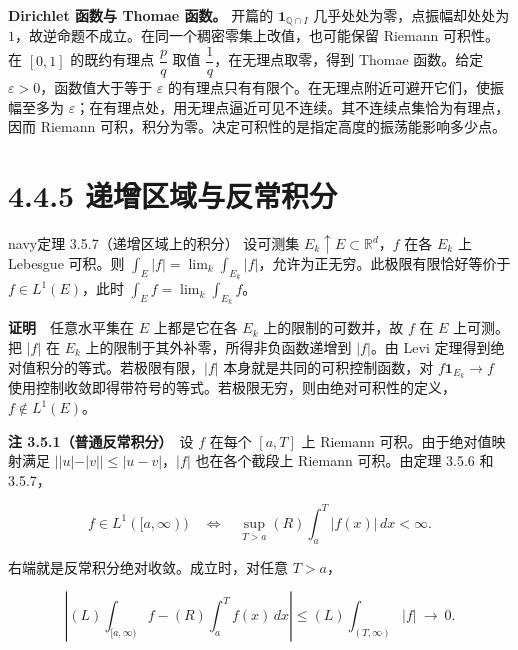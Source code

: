 \documentclass[11pt,a4paper]{article}
\begin{document}
\textbf{Dirichlet 函数与 Thomae 函数。} 开篇的
\(\mathbf1_{\mathbb Q\cap I}\) 几乎处处为零，点振幅却处处为
\(1\)，故逆命题不成立。在同一个稠密零集上改值，也可能保留 Riemann
可积性。在 \([0,1]\) 的既约有理点 \(\dfrac pq\) 取值
\(\dfrac1q\)，在无理点取零，得到 Thomae 函数。给定
\(\varepsilon>0\)，函数值大于等于 \(\varepsilon\)
的有理点只有有限个。在无理点附近可避开它们，使振幅至多为
\(\varepsilon\)；在有理点处，用无理点逼近可见不连续。其不连续点集恰为有理点，因而
Riemann 可积，积分为零。决定可积性的是指定高度的振荡能影响多少点。

\section[\S{}4.4.5
递增区域与反常积分]{4.4.5
递增区域与反常积分}\label{ux9012ux589eux533aux57dfux4e0eux53cdux5e38ux79efux5206}

\begin{sboxenv}{navy}{定理 3.5.7（递增区域上的积分）}
设可测集 \(E_k\uparrow E\subset\mathbb R^d\)，\(f\) 在各 \(E_k\) 上
Lebesgue 可积。则
\(\int_E|f|=\lim_k\int_{E_k}|f|\)，允许为正无穷。此极限有限恰好等价于
\(f\in L^1(E)\)，此时 \(\int_E f=\lim_k\int_{E_k}f\)。

\end{sboxenv}

\textbf{证明}　任意水平集在 \(E\) 上都是它在各 \(E_k\)
上的限制的可数并，故 \(f\) 在 \(E\) 上可测。把 \(|f|\) 在 \(E_k\)
上的限制于其外补零，所得非负函数递增到 \(|f|\)。由 Levi
定理得到绝对值积分的等式。若极限有限，\(|f|\)
本身就是共同的可积控制函数，对 \(f\mathbf1_{E_k}\to f\)
使用控制收敛即得带符号的等式。若极限无穷，则由绝对可积性的定义，\(f\notin L^1(E)\)。

\textbf{注 3.5.1（普通反常积分）}　设 \(f\) 在每个 \([a,T]\) 上 Riemann
可积。由于绝对值映射满足 \(||u|-|v||\le|u-v|\)，\(|f|\) 也在各个截段上
Riemann 可积。由定理 3.5.6 和 3.5.7，

\begin{equation*}
f\in L^1([a,\infty))
\quad\Longleftrightarrow\quad
\sup_{T>a}(R)\int_a^T |f(x)|\,dx<\infty .
\tag{4.4.5}
\end{equation*}

右端就是反常积分绝对收敛。成立时，对任意 \(T>a\)，

\begin{equation*}
\left|(L)\int_{[a,\infty)}f-(R)\int_a^T f(x)\,dx\right|
\le (L)\int_{(T,\infty)}|f|\ \longrightarrow\ 0 .
\end{equation*}
\end{document}
